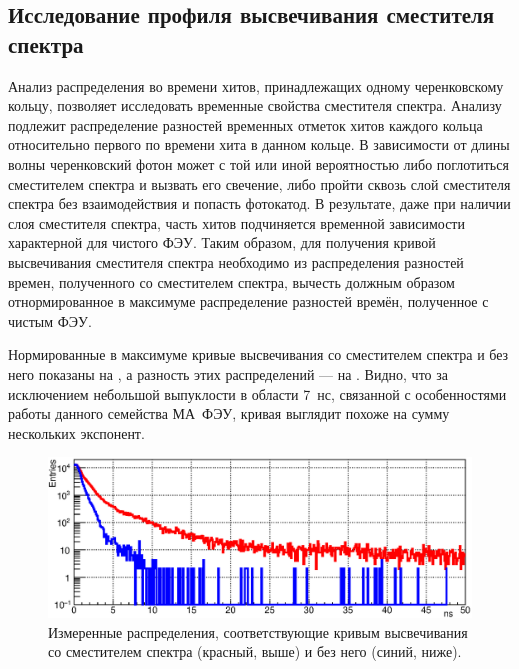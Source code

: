 \subsection{Исследование профиля высвечивания сместителя спектра}\label{section:secWLS}

Анализ распределения во времени хитов, принадлежащих одному черенковскому кольцу, позволяет исследовать временные свойства сместителя спектра. Анализу подлежит распределение разностей временных отметок хитов каждого кольца относительно первого по времени хита в данном кольце. В зависимости от длины волны черенковский фотон может с той или иной вероятностью либо поглотиться сместителем спектра и вызвать его свечение, либо пройти сквозь слой сместителя спектра без взаимодействия и попасть фотокатод. В результате, даже при наличии слоя сместителя спектра, часть хитов подчиняется временной зависимости характерной для чистого ФЭУ. Таким образом, для получения кривой высвечивания сместителя спектра необходимо из распределения разностей времен, полученного со сместителем спектра, вычесть должным образом отнормированное в максимуме распределение разностей времён, полученное с чистым ФЭУ.

Нормированные в максимуме кривые высвечивания со сместителем спектра и без него показаны на , а разность этих распределений --- на . Видно, что за исключением небольшой выпуклости в области 7~нс, связанной с особенностями работы данного семейства МА~ФЭУ, кривая выглядит похоже на сумму нескольких экспонент.

\begin{figure}[H]
\centering
\includegraphics[width=1.0\textwidth]{pictures/26_WLS_8feb.eps}
\caption{Измеренные распределения, соответствующие кривым высвечивания со сместителем спектра (красный, выше) и без него (синий, ниже).}
\label{fig:WLStwoCurves}
\end{figure}

